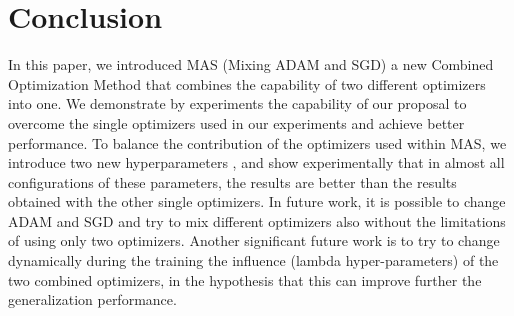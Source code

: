 \documentclass[10pt,twocolumn,letterpaper]{article}
\begin{document}
\section{Conclusion}
In this paper, we introduced MAS (Mixing ADAM and SGD) a new Combined Optimization Method that combines the capability of two different optimizers into one. 
We demonstrate by experiments the capability of our proposal to overcome the single optimizers used in our experiments and achieve better performance.
To balance the contribution of the optimizers used within MAS, we introduce two new hyperparameters ,  and show experimentally that in almost all configurations of these parameters, the results are better than the results obtained with the other single optimizers.
In future work, it is possible to change ADAM and SGD and try to mix different optimizers also without the limitations of using only two optimizers.
Another significant future work is to try to change dynamically during the training the influence (lambda hyper-parameters) of the two combined optimizers, in the hypothesis that this can improve further the generalization performance. 




{\small


}
\end{document}
